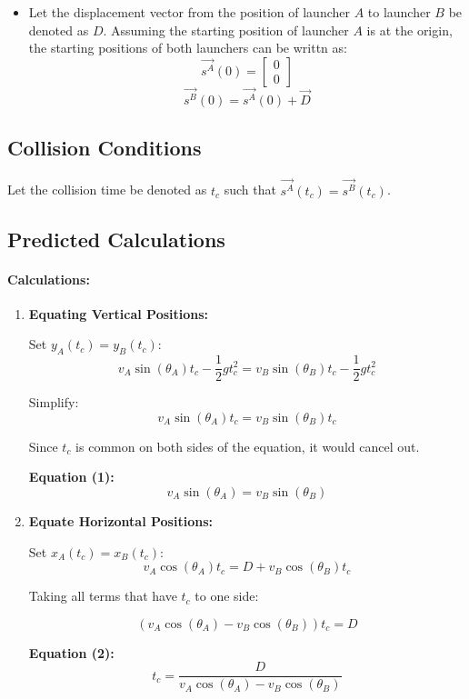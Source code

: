 \documentclass[12pt]{article}
\begin{document}
\begin{itemize}
\begin{itemize}
    \end{itemize}

    \item Let the displacement vector from the position of launcher $A$ to launcher $B$ be denoted as \(D\). Assuming the starting position of launcher $A$ is at the origin, the starting positions of both launchers can be writtn as:
    \[
    \vec{s^A}(0) = \begin{bmatrix} 0 \\ 0 \end{bmatrix}
    \]
    \[
    \vec{s^B}(0) = \vec{s^A}(0) + \vec{D}
    \]
    
\end{itemize}

\subsection{Collision Conditions}
Let the collision time be denoted as \(t_c\) such that \(\vec{s^A}(t_c) = \vec{s^B}(t_c)\).

\subsection{Predicted Calculations}

\paragraph{Calculations:}
\begin{enumerate}
    \item \textbf{Equating Vertical Positions:} 
    
    Set \( y_A(t_c) = y_B(t_c) \):
    \[
    v_A \sin(\theta_A) t_c - \frac{1}{2} g t_c^2 = v_B \sin(\theta_B) t_c - \frac{1}{2} g t_c^2
    \]
    
    Simplify:
    \[
    v_A \sin(\theta_A) t_c = v_B \sin(\theta_B) t_c
    \]
    
    Since \( t_c \) is common on both sides of the equation, it would cancel out.
    
    \textbf{Equation (1):}
    \[
    v_A \sin(\theta_A) = v_B \sin(\theta_B)
    \]
    
    \item \textbf{Equate Horizontal Positions:} 
    
    Set \( x_A(t_c) = x_B(t_c) \):
    \[
    v_A \cos(\theta_A) t_c = D + v_B \cos(\theta_B) t_c
    \]
    
    Taking all terms that have \( t_c \) to one side:

    \[
    (v_A \cos(\theta_A) - v_B \cos(\theta_B)) t_c = D
    \]
    
    \textbf{Equation (2):}
    \[
    t_c = \frac{D}{v_A \cos(\theta_A) - v_B \cos(\theta_B)}
    \]
\end{enumerate}
\end{document}
